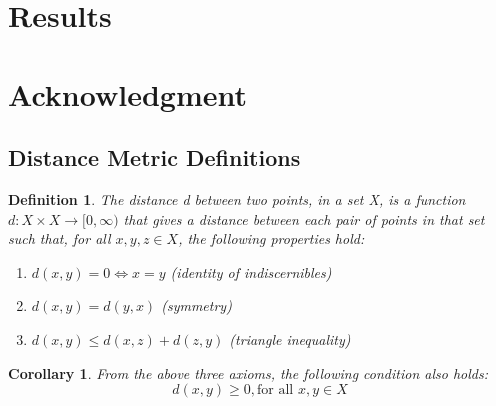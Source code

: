 \documentclass[conference]{IEEEtran}
\newtheorem{defn}{Definition}[section]
\newtheorem{cor}{Corollary}
\begin{document}
\section{Results} \label{sec:results}

\section*{Acknowledgment}





%






\appendix

\subsection{Distance Metric Definitions} \label{app:metrics}
\begin{defn} \label{def:distance}
The distance d between two points, in a set X, is a function $ d: X \times X \rightarrow [0, \infty)$ that gives a distance between each pair of points in that set such that, for all $x,y,z \in X$, the following properties hold:
\begin{enumerate}
\item $d(x,y) = 0 \iff x = y$ (identity of indiscernibles)
\item $d(x,y) = d(y,x)$ (symmetry)
\item $d(x,y) \leq d(x,z) + d(z,y)$ (triangle inequality)
\end{enumerate}
\end{defn}

\begin{cor}
From the above three axioms, the following condition also holds:
\begin{equation}
d(x,y) \geq 0, \text{for all } x,y \in X
\end{equation}
\end{cor}
\end{document}
